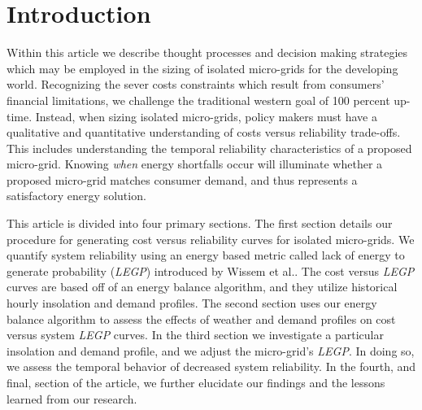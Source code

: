 \documentclass{article}
\begin{document}
\begin{abstract}

\end{abstract}

\section{Introduction}

Within this article we describe thought processes and decision making strategies which may be employed in the sizing of isolated micro-grids for the developing world.
Recognizing the sever costs constraints which result from consumers' financial limitations, we challenge the traditional western goal of 100 percent up-time.
Instead, when sizing isolated micro-grids, policy makers must have a qualitative and quantitative understanding of costs versus reliability trade-offs.
This includes understanding the temporal reliability characteristics of a proposed micro-grid.
Knowing \emph{when} energy shortfalls occur will illuminate whether a proposed micro-grid matches consumer demand, and thus represents a satisfactory energy solution.

This article is divided into four primary sections.
The first section details our procedure for generating cost versus reliability curves for isolated micro-grids.
We quantify system reliability using an energy based metric called lack of energy to generate probability (\emph{LEGP}) introduced by Wissem et al.\cite{}.
The cost versus \emph{LEGP} curves are based off of an energy balance algorithm, and they utilize historical hourly insolation and demand profiles.
The second section uses our energy balance algorithm to assess the effects of weather and demand profiles on cost versus system \emph{LEGP} curves.
In the third section we investigate a particular insolation and demand profile, and we adjust the micro-grid's \emph{LEGP}.
In doing so, we assess the temporal behavior of decreased system reliability.
In the fourth, and final, section of the article, we further elucidate our findings and the lessons learned from our research.
\end{document}
